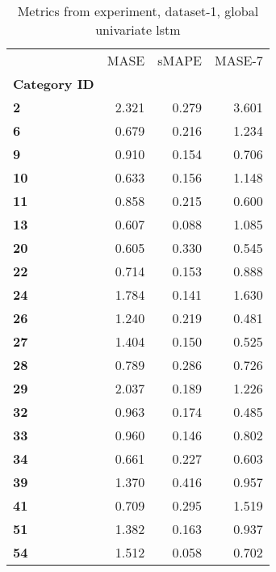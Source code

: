 \begin{table}[h]
\centering
\caption{Metrics from experiment, dataset-1, global univariate lstm}
\label{table:global-univariate-lstm-dataset-1}
\begin{tabular}{lrrr}
\toprule
{} &   MASE &  sMAPE &  MASE-7 \\
\textbf{Category ID} &        &        &         \\
\midrule
\textbf{2          } &  2.321 &  0.279 &   3.601 \\
\textbf{6          } &  0.679 &  0.216 &   1.234 \\
\textbf{9          } &  0.910 &  0.154 &   0.706 \\
\textbf{10         } &  0.633 &  0.156 &   1.148 \\
\textbf{11         } &  0.858 &  0.215 &   0.600 \\
\textbf{13         } &  0.607 &  0.088 &   1.085 \\
\textbf{20         } &  0.605 &  0.330 &   0.545 \\
\textbf{22         } &  0.714 &  0.153 &   0.888 \\
\textbf{24         } &  1.784 &  0.141 &   1.630 \\
\textbf{26         } &  1.240 &  0.219 &   0.481 \\
\textbf{27         } &  1.404 &  0.150 &   0.525 \\
\textbf{28         } &  0.789 &  0.286 &   0.726 \\
\textbf{29         } &  2.037 &  0.189 &   1.226 \\
\textbf{32         } &  0.963 &  0.174 &   0.485 \\
\textbf{33         } &  0.960 &  0.146 &   0.802 \\
\textbf{34         } &  0.661 &  0.227 &   0.603 \\
\textbf{39         } &  1.370 &  0.416 &   0.957 \\
\textbf{41         } &  0.709 &  0.295 &   1.519 \\
\textbf{51         } &  1.382 &  0.163 &   0.937 \\
\textbf{54         } &  1.512 &  0.058 &   0.702 \\
\bottomrule
\end{tabular}
\end{table}
